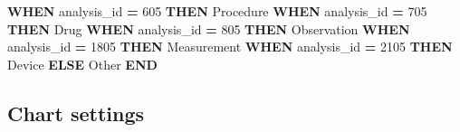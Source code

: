 \documentclass[
]{book}
\newenvironment{Shaded}{\begin{snugshade}}{\end{snugshade}}
\newcommand{\ControlFlowTok}[1]{\textcolor[rgb]{0.13,0.29,0.53}{\textbf{#1}}}
\newcommand{\DecValTok}[1]{\textcolor[rgb]{0.00,0.00,0.81}{#1}}
\newcommand{\NormalTok}[1]{#1}
\newcommand{\OperatorTok}[1]{\textcolor[rgb]{0.81,0.36,0.00}{\textbf{#1}}}
\newcommand{\StringTok}[1]{\textcolor[rgb]{0.31,0.60,0.02}{#1}}
\begin{document}
\begin{Shaded}
\begin{Highlighting}[]
    \ControlFlowTok{WHEN}\NormalTok{ analysis\_id }\OperatorTok{=} \DecValTok{605} \ControlFlowTok{THEN} \StringTok{\textquotesingle{}Procedure\textquotesingle{}}
    \ControlFlowTok{WHEN}\NormalTok{ analysis\_id }\OperatorTok{=} \DecValTok{705} \ControlFlowTok{THEN} \StringTok{\textquotesingle{}Drug\textquotesingle{}}
    \ControlFlowTok{WHEN}\NormalTok{ analysis\_id }\OperatorTok{=} \DecValTok{805} \ControlFlowTok{THEN} \StringTok{\textquotesingle{}Observation\textquotesingle{}}
    \ControlFlowTok{WHEN}\NormalTok{ analysis\_id }\OperatorTok{=} \DecValTok{1805} \ControlFlowTok{THEN} \StringTok{\textquotesingle{}Measurement\textquotesingle{}}
    \ControlFlowTok{WHEN}\NormalTok{ analysis\_id }\OperatorTok{=} \DecValTok{2105} \ControlFlowTok{THEN} \StringTok{\textquotesingle{}Device\textquotesingle{}}
    \ControlFlowTok{ELSE} \StringTok{\textquotesingle{}Other\textquotesingle{}} \ControlFlowTok{END}
\end{Highlighting}
\end{Shaded}

\hypertarget{chart-settings-26}{%
\subsection{Chart settings}\label{chart-settings-26}}
\end{document}
